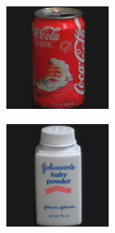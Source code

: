 \begin{figure}[tbp]
\begin{subfigure}{80pt}
    \caption{}
	\end{subfigure}
	\begin{subfigure}{80pt}
        \centering
    \includegraphics[width=\textwidth]{figures/coil_original/62.png}
    \caption{}
	\end{subfigure}
	\begin{subfigure}{80pt}
        \centering
    \includegraphics[width=\textwidth]{figures/coil_original/64.png}

\end{subfigure}
\end{figure}
